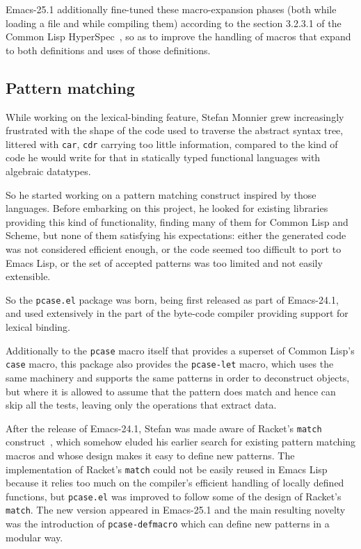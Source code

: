 \documentclass[format=acmsmall, review]{acmart}
\newcommand \Elisp {Emacs Lisp}
\begin{document}
Emacs-25.1 additionally fine-tuned these macro-expansion phases (both
while loading a file and while compiling them) according to the section
3.2.3.1 of the Common Lisp HyperSpec~\cite{HyperSpec}, so as to improve the
handling of macros that expand to both definitions and uses of
those definitions.

\subsection{Pattern matching}           %
\label{sec:pcase}

While working on the lexical-binding feature, Stefan Monnier grew
increasingly frustrated with the shape of the code used to traverse the
abstract syntax tree, littered with \texttt{car}, \texttt{cdr} carrying too
little information, compared to the kind of code he would write for that in
statically typed functional languages with algebraic datatypes.

So he started working on a pattern matching construct inspired by those
languages.  Before embarking on this project, he looked for existing
libraries providing this kind of functionality, finding many of them for
Common Lisp and Scheme, but none of them satisfying his expectations: either
the generated code was not considered efficient enough, or the code seemed
too difficult to port to \Elisp{}, or the set of accepted patterns was too
limited and not easily extensible.

So the \texttt{pcase.el} package was born,
being first released as part of Emacs-24.1, and used extensively in the part
of the byte-code compiler providing support for lexical binding.

Additionally to the \texttt{pcase} macro itself that provides a superset of
Common Lisp's \texttt{case} macro, this package also provides the
\texttt{pcase-let} macro, which uses the same machinery and supports the same
patterns in order to deconstruct objects, but where it is allowed to assume
that the pattern does match and hence can skip all the tests, leaving only the
operations that extract data.

After the release of Emacs-24.1, Stefan was made aware of Racket's
\texttt{match} construct~\cite{RacketReference2018}, which somehow eluded
his earlier search for
existing pattern matching macros and whose design makes it easy to define
new patterns.  The implementation of Racket's \texttt{match} could not be
easily reused in \Elisp{} because it relies too much on the compiler's
efficient handling of locally defined functions, but \texttt{pcase.el} was
improved to follow some of the design of Racket's \texttt{match}.
The new version appeared in Emacs-25.1 and the main resulting novelty was the
introduction of \texttt{pcase-defmacro} which can define new patterns
in a modular way. %
\end{document}
